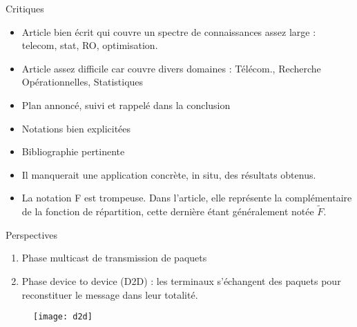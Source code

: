 \begin{frame} {Critiques}
\begin{itemize}
	\item Article bien écrit qui couvre un spectre de connaissances assez large : telecom, stat, RO, optimisation.
	\item Article assez difficile car couvre divers domaines : Télécom., Recherche Opérationnelles, Statistiques
	\item Plan annoncé, suivi et rappelé dans la conclusion
	\item Notations bien explicitées
	\item Bibliographie pertinente
	\item Il manquerait une application concrète, in situ, des résultats obtenus.
	\item La notation F est trompeuse. Dans l'article, elle représente la complémentaire de la fonction de répartition, cette dernière étant généralement notée $\tilde{F}$.
\end{itemize}


\end{frame}



\begin{frame} {Perspectives}

\begin{enumerate}
	\item Phase multicast de transmission de paquets
	\item Phase device to device (D2D) : les terminaux s'échangent des paquets pour reconstituer le message dans leur totalité. 

\end{enumerate}




\begin{figure}
	\centering
	\texttt{[image: d2d]}
	\label{fig:d2d}
\end{figure}


\end{frame}


%
%
